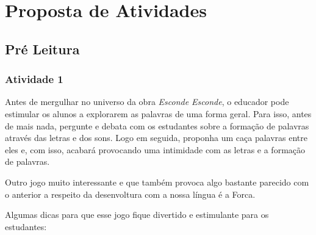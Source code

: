 \documentclass[11pt]{extarticle}
\begin{document}
\section{Proposta de Atividades}
\subsection{Pré Leitura}
\subsubsection{Atividade 1}


Antes de mergulhar no universo da obra \textit{Esconde Esconde}, o educador pode estimular os alunos a explorarem as palavras de uma forma geral. Para isso, antes de mais nada, pergunte e debata com os estudantes sobre a formação de palavras através das letras e dos sons. Logo em seguida, proponha um caça palavras entre eles e, com isso, acabará provocando uma intimidade com as letras e a formação de palavras. 


Outro jogo muito interessante e que também provoca algo bastante parecido com o anterior a respeito da desenvoltura com a nossa língua é a Forca. 

Algumas dicas para que esse jogo fique divertido e estimulante para os estudantes: 
\end{document}
